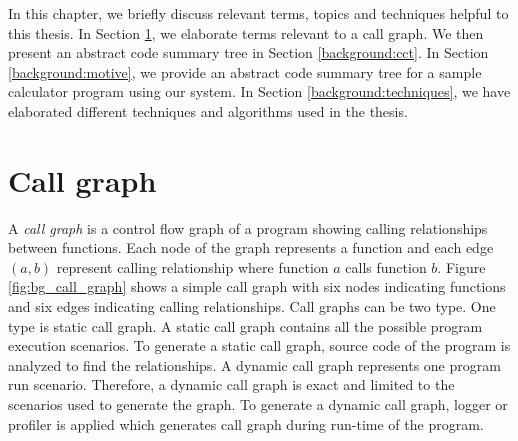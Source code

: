
\label{chapter:background}

In this chapter, we briefly discuss relevant terms, topics and techniques helpful to this thesis. In Section \ref{background:call_graph}, we elaborate terms relevant to a call graph. We then present an  abstract code summary tree in Section \ref{background:cct}. In Section \ref{background:motive}, we provide an abstract code summary tree for a sample calculator program using our system. In Section \ref{background:techniques}, we have elaborated different techniques and algorithms used in the thesis. 

\section{Call graph}
\label{background:call_graph}
A \emph{call graph} is a control flow graph of a program showing calling relationships between functions. Each node of the graph represents a function and each edge $(a, b)$ represent calling relationship where function $a$ calls function $b$. Figure \ref{fig:bg_call_graph} shows a simple call graph with six nodes indicating functions and six edges indicating calling relationships. Call graphs can be two type. One type is static call graph. A static call graph contains all the possible program execution scenarios. To generate a static call graph, source code of the program is analyzed to find the relationships. A dynamic call graph represents one program run scenario. Therefore, a dynamic call graph is exact and limited to the scenarios used to generate the graph. To generate a dynamic call graph, logger or profiler is applied which generates call graph during run-time of the program.


